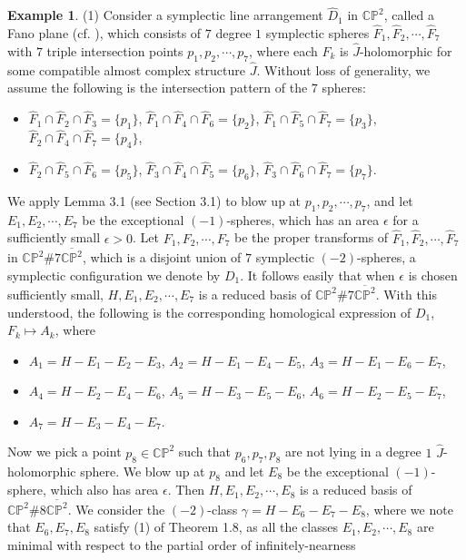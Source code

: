 \documentclass[11pt]{amsart}
\theoremstyle{plain}
\numberwithin{theorem}{section}
\theoremstyle{definition}
\newtheorem{example}[theorem]{Example}
\newcommand{\C}{{\mathbb C}}
\renewcommand{\P}{{\mathbb P}}
\begin{document}
\begin{example}
(1) Consider a symplectic line arrangement $\hat{D}_1$ in $\C\P^2$, called a Fano plane (cf. \cite{RuS}), which consists of $7$ degree $1$ symplectic spheres $\hat{F}_1, \hat{F}_2,\cdots,\hat{F}_7$ with $7$ triple intersection points $p_1,p_2,\cdots,p_7$, where each $\hat{F}_k$ is $\hat{J}$-holomorphic for some compatible almost complex structure $\hat{J}$. Without loss of generality, we assume the following is the intersection pattern of the $7$ spheres:
\begin{itemize}
\item $\hat{F}_1\cap \hat{F}_2\cap \hat{F}_3=\{p_1\}$, $\hat{F}_1\cap \hat{F}_4\cap \hat{F}_6=\{p_2\}$, 
$\hat{F}_1\cap \hat{F}_5\cap \hat{F}_7=\{p_3\}$, $\hat{F}_2\cap \hat{F}_4\cap \hat{F}_7=\{p_4\}$, 
\item $\hat{F}_2\cap \hat{F}_5\cap \hat{F}_6=\{p_5\}$, 
$\hat{F}_3\cap \hat{F}_4\cap \hat{F}_5=\{p_6\}$, $\hat{F}_3\cap \hat{F}_6\cap \hat{F}_7=\{p_7\}$.
\end{itemize}
We apply Lemma 3.1 (see Section 3.1) to blow up at $p_1,p_2,\cdots,p_7$, and let $E_1,E_2,\cdots,E_7$ be the exceptional $(-1)$-spheres, which has an area $\epsilon$ for a sufficiently small $\epsilon>0$. Let $F_1,F_2,\cdots,F_7$ be the proper transforms of  $\hat{F}_1, \hat{F}_2,\cdots,\hat{F}_7$ in $\C\P^2\#7\overline{\C\P^2}$, which is a disjoint union of $7$ symplectic $(-2)$-spheres, a symplectic configuration we denote by $D_1$. It follows easily that when 
$\epsilon$ is chosen sufficiently small, $H, E_1,E_2,\cdots,E_7$ is a reduced basis of $\C\P^2\#7\overline{\C\P^2}$. With this understood, the following is the corresponding homological expression of $D_1$, $F_k\mapsto A_k$, where
\begin{itemize}
\item $A_1=H-E_{1}-E_{2}-E_{3}$, $A_2=H-E_{1}-E_{4}-E_{5}$, $A_3=H-E_{1}-E_{6}-E_{7}$, 
\item $A_4=H-E_{2}-E_{4}-E_{6}$, $A_5=H-E_{3}-E_{5}-E_{6}$, $A_6=H-E_{2}-E_{5}-E_{7}$, 
\item $A_7=H-E_{3}-E_{4}-E_{7}$.
\end{itemize}
Now we pick a point $p_8\in \C\P^2$ such that $p_6,p_7,p_8$ are not lying in a degree $1$
$\hat{J}$-holomorphic sphere. We blow up at $p_8$ and let $E_8$ be the exceptional $(-1)$-sphere, which also
has area $\epsilon$. Then $H, E_1,E_2,\cdots,E_8$ is a reduced basis of $\C\P^2\#8\overline{\C\P^2}$.
We consider the $(-2)$-class $\gamma=H-E_6-E_7-E_8$, where we note that $E_6,E_7,E_8$ satisfy (1) of Theorem 1.8, as all the classes $E_1,E_2,\cdots,E_8$ are minimal with respect to the partial order of infinitely-nearness

\end{example}
\end{document}
